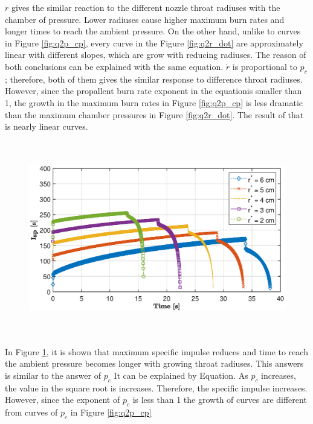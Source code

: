 \documentclass[letterpaper,12pt]{article}
\begin{document}
$\dot r$ gives the similar reaction to the different nozzle throat radiuses with the chamber of pressure. Lower radiuses cause higher 
maximum burn rates and longer times to reach the ambient pressure. On the other hand, unlike to curves in Figure \ref{fig:q2p_cp}, every 
curve in the Figure \ref{fig:q2r_dot} are approximately linear with different slopes, which are grow with reducing radiuses. The reason 
of both conclusions can be explained with the same equation. $\dot{r}$ is proportional to $p_c$; therefore, both of them gives 
the similar response to difference throat radiuses. However, since the propallent burn rate exponent in the equationis smaller than 1, 
the growth in the maximum burn rates in Figure \ref{fig:q2p_cp} is less dramatic than the maximum chamber pressures in Figure 
\ref{fig:q2r_dot}. The result of that is nearly linear curves.

\begin{figure}[!h]
	\centering
	\includegraphics[height = 8.5cm]{graphs/q2_isp.eps}
	\label{fig:q2I_sp}
\end{figure}
In Figure \ref{fig:q2I_sp}, it is shown that maximum specific impulse reduces and time to reach the ambient pressure becomes longer with
growing throat radiuses. This answers is similar to the answer of $p_c$ It can be explained by Equation. As $p_c$ increases, the value in
the square root is increases. Therefore, the specific impulse increases. However, since the exponent of $p_c$ is less than 1 the growth of 
curves are different from curves of $p_c$ in Figure \ref{fig:q2p_cp}

\end{document}
